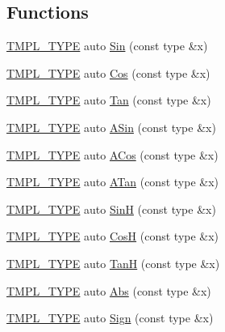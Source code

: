 \subsection*{Functions}
\begin{DoxyCompactItemize}
\item 
\hyperlink{_math_8h_a2618808fbb8e74983f8aaea56d02752b}{T\+M\+P\+L\+\_\+\+T\+Y\+PE} auto \hyperlink{namespace_g_f_w_1_1_math_a5d94530e56f28a39bccc3ecbef6de22c}{Sin} (const type \&x)
\item 
\hyperlink{_math_8h_a2618808fbb8e74983f8aaea56d02752b}{T\+M\+P\+L\+\_\+\+T\+Y\+PE} auto \hyperlink{namespace_g_f_w_1_1_math_a29f5220fad9df933923a6371b5872fcb}{Cos} (const type \&x)
\item 
\hyperlink{_math_8h_a2618808fbb8e74983f8aaea56d02752b}{T\+M\+P\+L\+\_\+\+T\+Y\+PE} auto \hyperlink{namespace_g_f_w_1_1_math_a675330340380965c011454fa2f450b27}{Tan} (const type \&x)
\item 
\hyperlink{_math_8h_a2618808fbb8e74983f8aaea56d02752b}{T\+M\+P\+L\+\_\+\+T\+Y\+PE} auto \hyperlink{namespace_g_f_w_1_1_math_a0919188bbf1a9435607f9fd1a75bf17a}{A\+Sin} (const type \&x)
\item 
\hyperlink{_math_8h_a2618808fbb8e74983f8aaea56d02752b}{T\+M\+P\+L\+\_\+\+T\+Y\+PE} auto \hyperlink{namespace_g_f_w_1_1_math_aac4524d3d48eaf6b4fa28b888945e051}{A\+Cos} (const type \&x)
\item 
\hyperlink{_math_8h_a2618808fbb8e74983f8aaea56d02752b}{T\+M\+P\+L\+\_\+\+T\+Y\+PE} auto \hyperlink{namespace_g_f_w_1_1_math_a8fe2d05d402b53d79b43fc9174cb619e}{A\+Tan} (const type \&x)
\item 
\hyperlink{_math_8h_a2618808fbb8e74983f8aaea56d02752b}{T\+M\+P\+L\+\_\+\+T\+Y\+PE} auto \hyperlink{namespace_g_f_w_1_1_math_a4452145ca0677fece1461731ff3bcf1b}{SinH} (const type \&x)
\item 
\hyperlink{_math_8h_a2618808fbb8e74983f8aaea56d02752b}{T\+M\+P\+L\+\_\+\+T\+Y\+PE} auto \hyperlink{namespace_g_f_w_1_1_math_af1a8ba37dfff8fbb41d20b0d96ead5a0}{CosH} (const type \&x)
\item 
\hyperlink{_math_8h_a2618808fbb8e74983f8aaea56d02752b}{T\+M\+P\+L\+\_\+\+T\+Y\+PE} auto \hyperlink{namespace_g_f_w_1_1_math_a1d4737bb0b66ba69f20b3a1a11bafa69}{TanH} (const type \&x)
\item 
\hyperlink{_math_8h_a2618808fbb8e74983f8aaea56d02752b}{T\+M\+P\+L\+\_\+\+T\+Y\+PE} auto \hyperlink{namespace_g_f_w_1_1_math_af47c2128bcb50d8200a7c9ecb07e0d22}{Abs} (const type \&x)
\item 
\hyperlink{_math_8h_a2618808fbb8e74983f8aaea56d02752b}{T\+M\+P\+L\+\_\+\+T\+Y\+PE} auto \hyperlink{namespace_g_f_w_1_1_math_aee647b8162ce903bf355590d80d99315}{Sign} (const type \&x)

\end{DoxyCompactItemize}
